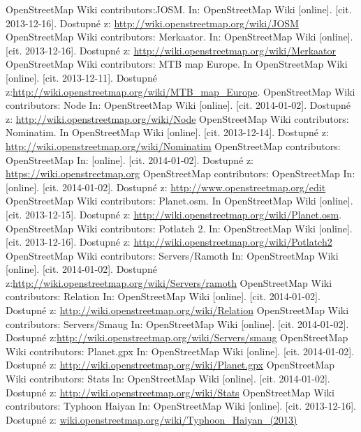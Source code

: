 \documentclass[11pt,a4paper,titlepage,oneside]{book}
\begin{document}
\begin{thebibliography}{99}
	OpenStreetMap Wiki contributors:JOSM. In: OpenStreetMap Wiki [online]. [cit. 2013-12-16]. Dostupné z:  \url{http://wiki.openstreetmap.org/wiki/JOSM}
	OpenStreetMap Wiki contributors: Merkaator. In: OpenStreetMap Wiki [online]. [cit. 2013-12-16]. Dostupné z:  \url{http://wiki.openstreetmap.org/wiki/Merkaator}
	OpenStreetMap Wiki contributors:  MTB map Europe. In OpenStreetMap Wiki [online]. [cit. 2013-12-11]. Dostupné z:\url{http://wiki.openstreetmap.org/wiki/MTB_map_Europe}.
	OpenStreetMap Wiki contributors: Node In: OpenStreetMap Wiki [online]. [cit. 2014-01-02]. Dostupné z: \url{http://wiki.openstreetmap.org/wiki/Node}
	OpenStreetMap Wiki contributors: Nominatim. In OpenStreetMap Wiki [online]. [cit. 2013-12-14]. Dostupné z: \url{http://wiki.openstreetmap.org/wiki/Nominatim}	
	OpenStreetMap contributors: OpenStreetMap In:  [online]. [cit. 2014-01-02]. Dostupné z:	\url{https://wiki.openstreetmap.org}
	OpenStreetMap contributors: OpenStreetMap In:  [online]. [cit. 2014-01-02]. Dostupné z:	\url{http://www.openstreetmap.org/edit}
	OpenStreetMap Wiki contributors: Planet.osm. In OpenStreetMap Wiki [online]. [cit. 2013-12-15]. Dostupné z: \url{http://wiki.openstreetmap.org/wiki/Planet.osm}.
	OpenStreetMap Wiki contributors: Potlatch 2. In: OpenStreetMap Wiki [online]. [cit. 2013-12-16]. Dostupné z:  \url{http://wiki.openstreetmap.org/wiki/Potlatch2}
	OpenStreetMap Wiki contributors: Servers/Ramoth In: OpenStreetMap Wiki [online]. [cit. 2014-01-02]. Dostupné z:\url{http://wiki.openstreetmap.org/wiki/Servers/ramoth}
	OpenStreetMap Wiki contributors: Relation In: OpenStreetMap Wiki [online]. [cit. 2014-01-02]. Dostupné z: \url{http://wiki.openstreetmap.org/wiki/Relation}
	OpenStreetMap Wiki contributors: Servers/Smaug In: OpenStreetMap Wiki [online]. [cit. 2014-01-02]. Dostupné z:\url{http://wiki.openstreetmap.org/wiki/Servers/smaug}
	OpenStreetMap Wiki contributors: Planet.gpx In: OpenStreetMap Wiki [online]. [cit. 2014-01-02]. Dostupné z: \url{http://wiki.openstreetmap.org/wiki/Planet.gpx}
	OpenStreetMap Wiki contributors: Stats In: OpenStreetMap Wiki [online]. [cit. 2014-01-02]. Dostupné z: \url{http://wiki.openstreetmap.org/wiki/Stats}
	OpenStreetMap Wiki contributors: Typhoon Haiyan In: OpenStreetMap Wiki [online]. [cit. 2013-12-16]. Dostupné z: \url{wiki.openstreetmap.org/wiki/Typhoon_Haiyan_(2013)}

\end{thebibliography}
\end{document}
